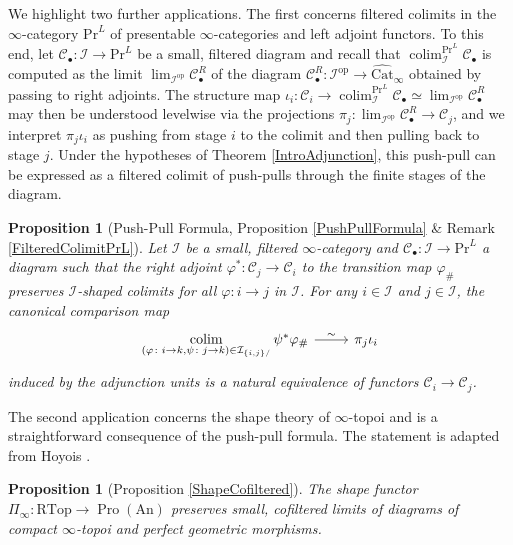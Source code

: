 \documentclass[a4paper,reqno,10pt]{amsart}
\newtheorem{introproposition}[introtheorem]{Proposition}
\theoremstyle{definition}
\theoremstyle{remark}
\newcommand{\C}{\mathcal{C}}
\newcommand{\I}{\mathcal{I}}
\DeclareMathOperator*{\colim}{colim}
\newcommand{\Cat}{\mathrm{Cat}}
\newcommand{\An}{\mathrm{An}}
\renewcommand{\Pr}{\mathrm{Pr}}
\newcommand{\Pro}{\operatorname{Pro}}
\newcommand{\RTop}{\mathrm{RTop}}
\newcommand{\op}{\mathrm{op}}
\begin{document}
We highlight two further applications. The first concerns filtered colimits in the $\infty$-category $\Pr^L$ of presentable $\infty$-categories and left adjoint functors. To this end, let $\C_{\bullet}\colon\I\rightarrow\Pr^L$ be a small, filtered diagram and recall that $\colim_{\I}^{\Pr^L}\C_{\bullet}$ is computed as the limit $\lim_{\I^{\op}}\C_{\bullet}^R$ of the diagram $\C_{\bullet}^R\colon\I^{\op}\rightarrow\widehat{\Cat}_{\infty}$ obtained by passing to right adjoints. The structure map $\iota_i\colon\C_i\rightarrow\colim_{\I}^{\Pr^L}\C_{\bullet}\simeq\lim_{\I^{\op}}\C_{\bullet}^R$ may then be understood levelwise via the projections $\pi_j\colon\lim_{\I^{\op}}\C_{\bullet}^R\rightarrow\C_j$, and we interpret $\pi_j\iota_i$ as pushing from stage $i$ to the colimit and then pulling back to stage $j$. Under the hypotheses of Theorem \ref{IntroAdjunction}, this push-pull can be expressed as a filtered colimit of push-pulls through the finite stages of the diagram.

\begin{introproposition}[Push-Pull Formula, Proposition \ref{PushPullFormula} \& Remark \ref{FilteredColimitPrL}]\label{IntroPushPull}
Let $\I$ be a small, filtered $\infty$-category and $\C_{\bullet}\colon\I\rightarrow\Pr^L$ a diagram such that the right adjoint $\varphi^{\ast}\colon\C_j\rightarrow\C_i$ to the transition map $\varphi_{\#}$ preserves $\I$-shaped colimits for all $\varphi\colon i\rightarrow j$ in $\I$. For any $i\in\I$ and $j\in\I$, the canonical comparison map
\begin{equation*}
\begin{tikzcd}
\colim\limits_{(\varphi\colon i\rightarrow k,\psi\colon j\rightarrow k)\in\I_{\{i,j\}/}}\psi^{\ast}\varphi_{\#}\arrow[r,"\sim"] & \pi_j\iota_i
\end{tikzcd}
\end{equation*}
induced by the adjunction units is a natural equivalence of functors $\C_i\rightarrow\C_j$.
\end{introproposition}

The second application concerns the shape theory of $\infty$-topoi and is a straightforward consequence of the push-pull formula. The statement is adapted from Hoyois \cite[Proposition 2.11, (1)]{Hoyois}.

\begin{introproposition}[Proposition \ref{ShapeCofiltered}]\label{IntroShapeCofiltered}
The shape functor $\Pi_{\infty}\colon\RTop\rightarrow\Pro(\An)$ preserves small, cofiltered limits of diagrams of compact $\infty$-topoi and perfect geometric morphisms.
\end{introproposition}
\end{document}
